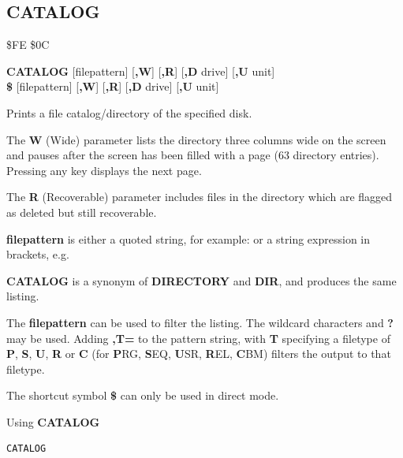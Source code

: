 \subsection{CATALOG}
\begin{description}[leftmargin=2cm,style=nextline]
\item [Token:]    \$FE \$0C

\item [Format:]   {\bf CATALOG} [filepattern] [{\bf,W}] [{\bf,R}] [{\bf,D} drive] [{\bf,U} unit] \\
		            {\bf\$} [filepattern] [{\bf,W}] [{\bf,R}] [{\bf,D} drive] [{\bf,U} unit]

\item [Usage:]    Prints a file catalog/directory of the specified disk.

                  The {\bf W} (Wide) parameter lists the directory three columns wide on the screen and pauses after the screen has been filled with a page (63 directory entries). Pressing any key displays the next page.

                  The {\bf R} (Recoverable) parameter includes files in the directory which are flagged as deleted but still recoverable.

                  {\bf filepattern} is either a quoted string, for example:  or a string expression in brackets, e.g. 

                  \drivedefinition

                  \unitdefinition

\item [Remarks:]  {\bf CATALOG} is a synonym of {\bf DIRECTORY} and {\bf DIR}, and produces the same listing.

                  The {\bf filepattern} can be used to filter the listing. The wildcard characters {\bf *} and {\bf ?} may be used. Adding {\bf ,T=} to the pattern string, with {\bf T} specifying a filetype of {\bf P}, {\bf S}, {\bf U}, {\bf R} or {\bf C} (for {\bf P}RG, {\bf S}EQ, {\bf U}SR, {\bf R}EL, {\bf C}BM) filters the output to that filetype.

                  The shortcut symbol {\bf \$} can only be used in direct mode.

\item [Examples:] Using {\bf CATALOG}

\begin{tcolorbox}[colback=black,coltext=white]
\verbatimfont{\codefont}
\begin{verbatim}
CATALOG
\end{verbatim}


\end{tcolorbox}
\end{description}
